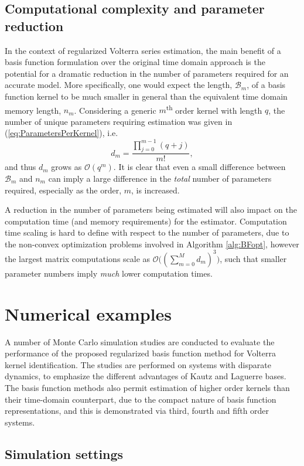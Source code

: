 \subsection{Computational complexity and parameter reduction}

In the context of regularized Volterra series estimation, the main benefit of a basis function formulation over the original time domain approach is the potential for a dramatic reduction in the number of parameters required for an accurate model. More specifically, one would expect the length, $\mathcal{B}_m$, of a basis function kernel to be much smaller in general than the equivalent time domain memory length, $n_m$. Considering a generic $m$\textsuperscript{th} order kernel with length $q$, the number of unique parameters requiring estimation was given in (\ref{eq:ParametersPerKernel}), i.e.  
$$d_m = \frac{\prod_{j=0}^{m-1}(q+j)}{m!},$$
and thus $d_m$ grows as $\mathcal{O}(q^m)$. It is clear that even a small difference between $\mathcal{B}_m$ and $n_m$ can imply a large difference in the \emph{total} number of parameters required, especially as the order, $m$, is increased. 

A reduction in the number of parameters being estimated will also impact on the computation time (and memory requirements) for the estimator. Computation time scaling is hard to define with respect to the number of parameters, due to the non-convex optimization problems involved in Algorithm \ref{alg:BFopt}, however the largest matrix computations scale as $\mathcal{O}\big((\sum_{m=0}^{M} d_m)^3\big)$, such that smaller parameter numbers imply \emph{much} lower computation times.

\section{Numerical examples}

A number of Monte Carlo simulation studies are conducted to evaluate the performance of the proposed regularized basis function method for Volterra kernel identification. The studies are performed on systems with disparate dynamics, to emphasize the different advantages of Kautz and Laguerre bases. The basis function methods also permit estimation of higher order kernels than their time-domain counterpart, due to the compact nature of basis function representations, and this is demonstrated via third, fourth and fifth order systems.

\subsection{Simulation settings}

